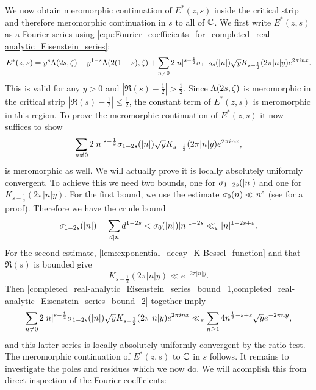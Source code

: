       We now obtain meromorphic continuation of $E^{\ast}(z,s)$ inside the critical strip and therefore meromorphic continuation in $s$ to all of $\mathbb{C}$. We first write $E^{\ast}(z,s)$ as a Fourier series using \cref{equ:Fourier_coefficients_for_completed_real-analytic_Eisenstein_series}:
      \[
        E^{\ast}(z,s) = y^{s}\Lambda(2s,\zeta)+y^{1-s}\Lambda(2(1-s),\zeta)+\sum_{n \neq 0}2|n|^{s-\frac{1}{2}}\sigma_{1-2s}(|n|)\sqrt{y}K_{s-\frac{1}{2}}(2\pi|n|y)e^{2\pi inx}.
      \]
      This is valid for any $y > 0$ and $|\Re(s)-\frac{1}{2}| > \frac{1}{2}$. Since $\Lambda(2s,\zeta)$ is meromorphic in the critical strip $|\Re(s)-\frac{1}{2}| \le \frac{1}{2}$, the constant term of $E^{\ast}(z,s)$ is meromorphic in this region. To prove the meromorphic continuation of $E^{\ast}(z,s)$ it now suffices to show
      \[
        \sum_{n \neq 0}2|n|^{s-\frac{1}{2}}\sigma_{1-2s}(|n|)\sqrt{y}K_{s-\frac{1}{2}}(2\pi|n|y)e^{2\pi inx},
      \]
      is meromorphic as well. We will actually prove it is locally absolutely uniformly convergent. To achieve this we need two bounds, one for $\sigma_{1-2s}(|n|)$ and one for $K_{s-\frac{1}{2}}(2\pi|n|y)$. For the first bound, we use the estimate $\sigma_{0}(n) \ll n^{\varepsilon}$ (see \cite{montgomery2007multiplicative} for a proof). Therefore we have the crude bound
      \begin{equation}\label{completed_real-analytic_Eisenstein_series_bound_1}
        \sigma_{1-2s}(|n|) = \sum_{d \mid n}d^{1-2s} < \sigma_{0}(|n|)|n|^{1-2s} \ll_{\varepsilon}|n|^{1-2s+\varepsilon}.
      \end{equation}
      For the second estimate, \cref{lem:exponential_decay_K-Bessel_function} and that $\Re(s)$ is bounded give
      \begin{equation}\label{completed_real-analytic_Eisenstein_series_bound_2}
        K_{s-\frac{1}{2}}(2\pi|n|y) \ll e^{-2\pi|n|y}.
      \end{equation}
      Then \cref{completed_real-analytic_Eisenstein_series_bound_1,completed_real-analytic_Eisenstein_series_bound_2} together imply
      \begin{equation}\label{equ:non-constant_Fourier_coefficient_bound_non-holomorphic_Eisenstein_series}
        \sum_{n \neq 0}2|n|^{s-\frac{1}{2}}\sigma_{1-2s}(|n|)\sqrt{y}K_{s-\frac{1}{2}}(2\pi|n|y)e^{2\pi inx} \ll_{\varepsilon} \sum_{n \ge 1}4n^{\frac{1}{2}-s+\varepsilon}\sqrt{y}e^{-2\pi ny},
      \end{equation}
      and this latter series is locally absolutely uniformly convergent by the ratio test. The meromorphic continuation of $E^{\ast}(z,s)$ to $\mathbb{C}$ in $s$ follows. It remains to investigate the poles and residues which we now do. We will acomplish this from direct inspection of the Fourier coefficients:

